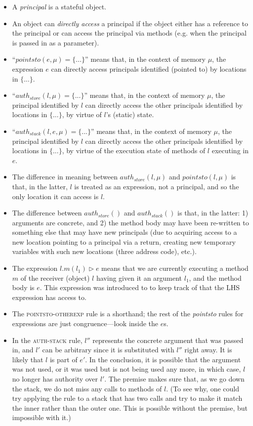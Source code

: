 \documentclass{llncs}
\begin{document}
\begin{itemize}
\item A \textit{principal} is a stateful object.
\item An object can \emph{directly access} a principal if the object either has a reference to the principal or can access the principal via methods (e.g. when the principal is passed in as a parameter).
\item ``$pointsto(e, \mu) = \{ ... \}$'' means that, in the context of memory $\mu$, the expression $e$ can directly access principals identified (pointed to) by locations in $\{ ... \}$.
\item ``$auth_{store}(l, \mu) = \{ ... \}$'' means that, in the context of memory $\mu$, the principal identified by $l$ can directly access the other principals identified by locations in $\{ ... \}$, by virtue of $l$'s (static) state.
\item ``$auth_{stack}(l, e, \mu) = \{ ... \}$'' means that, in the context of memory $\mu$, the principal identified by $l$ can directly access the other principals identified by locations in $\{ ... \}$, by virtue of the execution state of methods of $l$ executing in $e$.
\item The difference in meaning between $auth_{store}(l, \mu)$ and $pointsto(l, \mu)$ is that, in the latter, $l$ is treated as an expression, not a principal, and so the only location it can access is $l$.
\item The difference between $auth_{store}()$ and $auth_{stack}()$ is that, in the latter: 1) arguments are concrete, and 2) the method body may have been re-written to something else that may have new principals (due to acquiring access to a new location pointing to a principal via a return, creating new temporary variables with such new locations (three address code), etc.).
\item The expression $l.m(l_1) \rhd e$ means that we are currently executing a method $m$ of the receiver (object) $l$ having given it an argument $l_1$, and the method body is $e$. This expression was introduced to to keep track of that the LHS expression has access to.
\item The \textsc{pointsto-otherexp} rule is a shorthand; the rest of the \textit{pointsto} rules for expressions are just congruence---look inside the $e$s.
\item In the \textsc{auth-stack} rule, $l''$ represents the concrete argument that was passed in, and $l'$ can be arbitrary since it is substituted with $l''$ right away.  It is likely that $l$ is part of $e'$. In the conclusion, it is possible that the argument was not used, or it was used but is not being used any more, in which case, $l$ no longer has authority over $l'$. The premise makes sure that, as we go down the stack, we do not miss any calls to methods of $l$. (To see why, one could try applying the rule to a stack that has two calls and try to make it match the inner rather than the outer one. This is possible without the premise, but impossible with it.)

\end{itemize}
\end{document}
